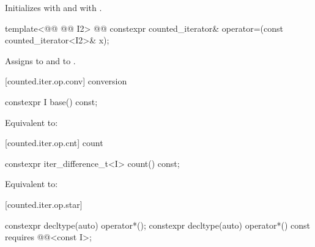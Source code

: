 \begin{addedblock}
\begin{itemdescr}
\pnum
\effects
Initializes  with  and
 with .
\end{itemdescr}

%
%
\begin{itemdecl}
template<@@ @@ I2>
  @@
    constexpr counted_iterator& operator=(const counted_iterator<I2>& x);
\end{itemdecl}

\begin{itemdescr}
\pnum
\effects
Assigns  to  and  to .
\end{itemdescr}

[counted.iter.op.conv]{ conversion}

%
%
\begin{itemdecl}
constexpr I base() const;
\end{itemdecl}

\begin{itemdescr}
\pnum
\effects Equivalent to: 
\end{itemdescr}

[counted.iter.op.cnt]{ count}

%
%
\begin{itemdecl}
constexpr iter_difference_t<I> count() const;
\end{itemdecl}

\begin{itemdescr}
\pnum
\effects Equivalent to: 
\end{itemdescr}

[counted.iter.op.star]{}

%
%
\begin{itemdecl}
constexpr decltype(auto) operator*();
constexpr decltype(auto) operator*() const
  requires @@<const I>;
\end{itemdecl}


\end{addedblock}
